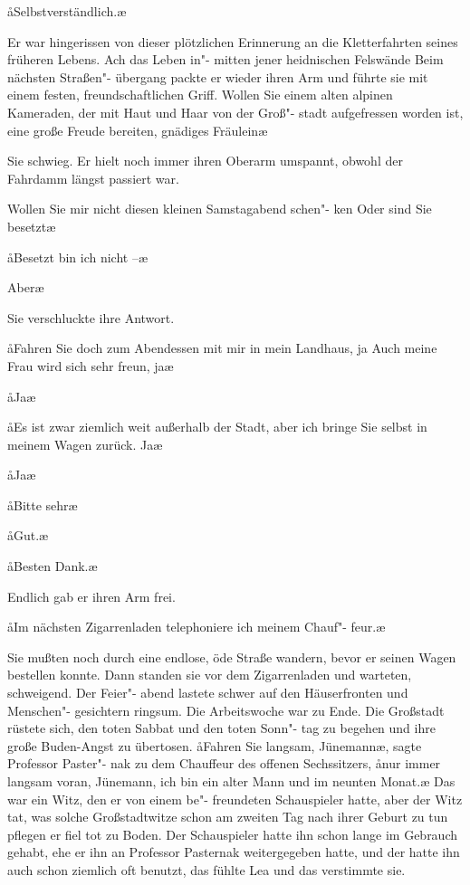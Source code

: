 \aa{}Selbstverständlich.\ae{}

Er war hingerissen von dieser plötzlichen Erinnerung an die
Kletterfahrten seines früheren Lebens. Ach das Leben in"-%
mitten jener heidnischen Felswände\ausr{} Beim nächsten Straßen"-%
übergang packte er wieder ihren Arm und führte sie mit einem
festen, freundschaftlichen Griff. \aanah{}Wollen Sie einem alten
alpinen Kameraden, der mit Haut und Haar von der Groß"-%
stadt aufgefressen worden ist, eine große Freude bereiten,
gnädiges Fräulein\frag{}\ae{}

Sie schwieg. Er hielt noch immer ihren Oberarm umspannt,
obwohl der Fahrdamm längst passiert war.

\aanah{}Wollen Sie mir nicht diesen kleinen Samstagabend schen"-%
ken\frag{} Oder sind Sie besetzt\frag{}\ae{}

\aa{}Besetzt bin ich nicht --\ae{}

\aanah{}Aber\frag{}\ae{}

Sie verschluckte ihre Antwort.

\aa{}Fahren Sie doch zum Abendessen mit mir in mein Landhaus,
ja\frag{} Auch meine Frau wird sich sehr freun, ja\frag{}\ae{}

\aa{}Ja\frag{}\ae{}

\aa{}Es ist zwar ziemlich weit außerhalb der Stadt, aber ich bringe
Sie selbst in meinem Wagen zurück. Ja\frag{}\ae{}

\aa{}Ja\frag{}\ae{}

\aa{}Bitte sehr\ausr{}\ae{}

\aa{}Gut.\ae{}

\aa{}Besten Dank.\ae{}

Endlich gab er ihren Arm frei.

\aa{}Im nächsten Zigarrenladen telephoniere ich meinem Chauf"-%
feur.\ae{}

Sie mußten noch durch eine endlose, öde Straße wandern,
bevor er seinen Wagen bestellen konnte. Dann standen sie
vor dem Zigarrenladen und warteten, schweigend. Der Feier"-%
abend lastete schwer auf den Häuserfronten und Menschen"-%
gesichtern ringsum. Die Arbeitswoche war zu Ende. Die
Großstadt rüstete sich, den toten Sabbat und den toten Sonn"-%
tag zu begehen und ihre große Buden-Angst zu übertosen.
\abstand{}
\aa{}Fahren Sie langsam, Jünemann\ae{},\eingriff{eS74-1}{Jünemann\ae{}, ] Jünemann,\ae{}} sagte Professor Paster"-%
nak zu dem Chauffeur des offenen Sechssitzers, \aa{}nur immer
langsam voran, Jünemann, ich bin ein alter Mann und im
neunten Monat.\ae{} Das war ein Witz, den er von einem be"-%
freundeten Schauspieler hatte, aber der Witz tat, was solche
Großstadtwitze schon am zweiten Tag nach ihrer Geburt zu
tun pflegen\dopp{} er fiel tot zu Boden. Der Schauspieler hatte ihn
schon lange im Gebrauch gehabt, ehe er ihn an Professor
Pasternak weitergegeben hatte, und der hatte ihn auch schon
ziemlich oft benutzt, das fühlte Lea und das verstimmte sie.

